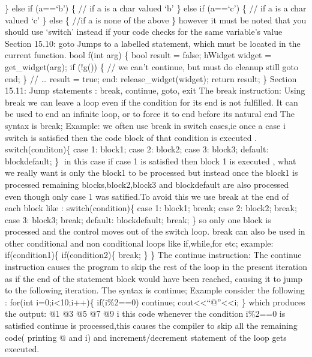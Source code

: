 \} else if (a==`b') \{ // if a is a char valued `b' \} else if (a==`c')
\{ // if a is a char valued `c' \} else \{ //if a is none of the above
\} however it must be noted that you should use `switch' instead if your
code checks for the same variable's value Section 15.10: goto Jumps to a
labelled statement, which must be located in the current function. bool
f(int arg) \{ bool result = false; hWidget widget = get\_widget(arg); if
(!g()) \{ // we can't continue, but must do cleanup still goto end; \}
// \ldots{} result = true; end: release\_widget(widget); return result;
\} Section 15.11: Jump statements : break, continue, goto, exit The
break instruction: Using break we can leave a loop even if the condition
for its end is not fulﬁlled. It can be used to end an inﬁnite loop, or
to force it to end before its natural end The syntax is break; Example:
we often use break in switch cases,ie once a case i switch is satisﬁed
then the code block of that condition is executed . switch(conditon)\{
case 1: block1; case 2: block2; case 3: block3; default: blockdefault;
\} in this case if case 1 is satisﬁed then block 1 is executed , what
we really want is only the block1 to be processed but instead once the
block1 is processed remaining blocks,block2,block3 and blockdefault are
also processed even though only case 1 was satiﬁed.To avoid this we use
break at the end of each block like : switch(condition)\{ case 1:
block1; break; case 2: block2; break; case 3: block3; break; default:
blockdefault; break; \} so only one block is processed and the control
moves out of the switch loop. break can also be used in other
conditional and non conditional loops like if,while,for etc; example:
if(condition1)\{ if(condition2)\{ break; \} \} The continue instruction:
The continue instruction causes the program to skip the rest of the loop
in the present iteration as if the end of the statement block would have
been reached, causing it to jump to the following iteration. The syntax
is continue; Example consider the following : for(int
i=0;i\textless10;i++)\{ if(i\%2==0) continue;
cout\textless\textless{}``\n @''\textless\textless i; \} which produces
the output: @1 @3 @5 @7 @9 i this code whenever the condition i\%2==0 is
satisﬁed continue is processed,this causes the compiler to skip all the
remaining code( printing @ and i) and increment/decrement statement of
the loop gets executed.
